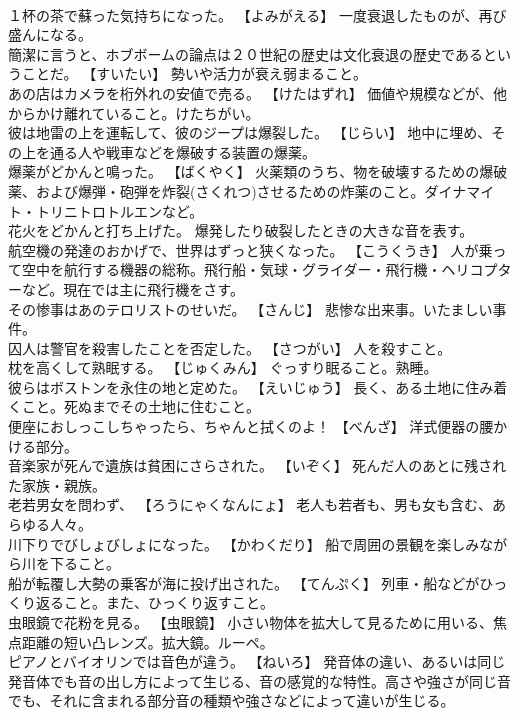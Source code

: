 \documentclass[8pt]{extreport}
\begin{document}
\begin{CJK}{UTF8}{min}
\\	１杯の茶で蘇った気持ちになった。	【よみがえる】 一度衰退したものが、再び盛んになる。
\\	簡潔に言うと、ホブボームの論点は２０世紀の歴史は文化衰退の歴史であるということだ。	【すいたい】 勢いや活力が衰え弱まること。
\\	あの店はカメラを桁外れの安値で売る。	【けたはずれ】 価値や規模などが、他からかけ離れていること。けたちがい。
\\	彼は地雷の上を運転して、彼のジープは爆裂した。	【じらい】 地中に埋め、その上を通る人や戦車などを爆破する装置の爆薬。
\\	爆薬がどかんと鳴った。	【ばくやく】 火薬類のうち、物を破壊するための爆破薬、および爆弾・砲弾を炸裂(さくれつ)させるための炸薬のこと。ダイナマイト・トリニトロトルエンなど。
\\	花火をどかんと打ち上げた。	爆発したり破裂したときの大きな音を表す。
\\	航空機の発達のおかげで、世界はずっと狭くなった。	【こうくうき】 人が乗って空中を航行する機器の総称。飛行船・気球・グライダー・飛行機・ヘリコプターなど。現在では主に飛行機をさす。
\\	その惨事はあのテロリストのせいだ。	【さんじ】 悲惨な出来事。いたましい事件。
\\	囚人は警官を殺害したことを否定した。	【さつがい】 人を殺すこと。
\\	枕を高くして熟眠する。	【じゅくみん】 ぐっすり眠ること。熟睡。
\\	彼らはボストンを永住の地と定めた。	【えいじゅう】 長く、ある土地に住み着くこと。死ぬまでその土地に住むこと。
\\	便座におしっこしちゃったら、ちゃんと拭くのよ！	【べんざ】 洋式便器の腰かける部分。
\\	音楽家が死んで遺族は貧困にさらされた。	【いぞく】 死んだ人のあとに残された家族・親族。
\\	老若男女を問わず、	【ろうにゃくなんにょ】 老人も若者も、男も女も含む、あらゆる人々。
\\	川下りでびしょびしょになった。	【かわくだり】 船で周囲の景観を楽しみながら川を下ること。
\\	船が転覆し大勢の乗客が海に投げ出された。	【てんぷく】 列車・船などがひっくり返ること。また、ひっくり返すこと。
\\	虫眼鏡で花粉を見る。	【虫眼鏡】 小さい物体を拡大して見るために用いる、焦点距離の短い凸レンズ。拡大鏡。ルーペ。
\\	ピアノとバイオリンでは音色が違う。	【ねいろ】 発音体の違い、あるいは同じ発音体でも音の出し方によって生じる、音の感覚的な特性。高さや強さが同じ音でも、それに含まれる部分音の種類や強さなどによって違いが生じる。

\end{CJK}
\end{document}
